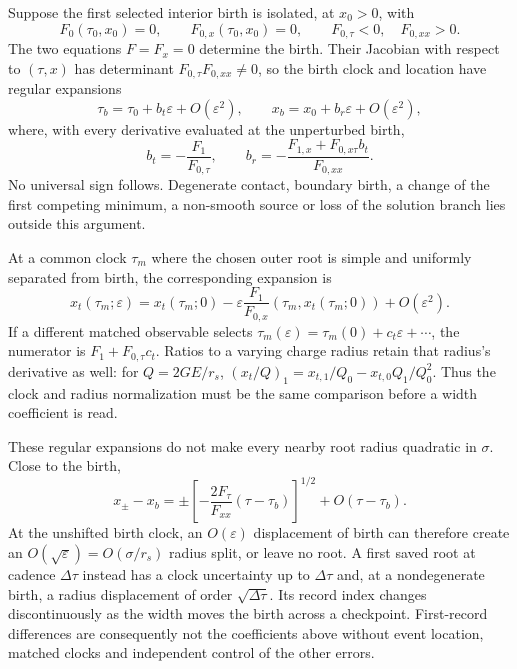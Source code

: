 \documentclass[11pt]{article}
\begin{document}
Suppose the first selected interior birth is isolated, at $x_0>0$, with
\[
 F_0(\tau_0,x_0)=0,\qquad F_{0,x}(\tau_0,x_0)=0,\qquad
 F_{0,\tau}<0,\quad F_{0,xx}>0.
\]
The two equations $F=F_x=0$ determine the birth. Their Jacobian with
respect to $(\tau,x)$ has determinant $F_{0,\tau}F_{0,xx}\ne0$, so the
birth clock and location have regular expansions
\[
 \tau_b=\tau_0+b_t\varepsilon+O(\varepsilon^2),\qquad
 x_b=x_0+b_r\varepsilon+O(\varepsilon^2),
\]
where, with every derivative evaluated at the unperturbed birth,
\[
 b_t=-\frac{F_1}{F_{0,\tau}},\qquad
 b_r=-\frac{F_{1,x}+F_{0,x\tau}b_t}{F_{0,xx}}.
\]
No universal sign follows. Degenerate contact, boundary birth, a change
of the first competing minimum, a non-smooth source or loss of the
solution branch lies outside this argument.

At a common clock $\tau_m$ where the chosen outer root is simple and
uniformly separated from birth, the corresponding expansion is
\[
 x_t(\tau_m;\varepsilon)
 =x_t(\tau_m;0)
 -\varepsilon\frac{F_1}{F_{0,x}}(\tau_m,x_t(\tau_m;0))
 +O(\varepsilon^2).
\]
If a different matched observable selects
$\tau_m(\varepsilon)=\tau_m(0)+c_t\varepsilon+\cdots$, the numerator is
$F_1+F_{0,\tau}c_t$. Ratios to a varying charge radius retain that
radius's derivative as well: for $Q=2GE/r_s$,
$(x_t/Q)_1=x_{t,1}/Q_0-x_{t,0}Q_1/Q_0^2$.
Thus the clock and radius normalization must be the same comparison
before a width coefficient is read.

These regular expansions do not make every nearby root radius
quadratic in $\sigma$. Close to the birth,
\[
 x_\pm-x_b
 =\pm\left[-\frac{2F_\tau}{F_{xx}}(\tau-\tau_b)\right]^{1/2}
   +O(\tau-\tau_b).
\]
At the unshifted birth clock, an $O(\varepsilon)$ displacement of birth
can therefore create an $O(\sqrt{\varepsilon})=O(\sigma/r_s)$ radius
split, or leave no root. A first saved root at cadence $\Delta\tau$
instead has a clock uncertainty up to $\Delta\tau$ and, at a
nondegenerate birth, a radius displacement of order
$\sqrt{\Delta\tau}$. Its record index changes discontinuously as the
width moves the birth across a checkpoint. First-record differences
are consequently not the coefficients above without event location,
matched clocks and independent control of the other errors.
\end{document}
